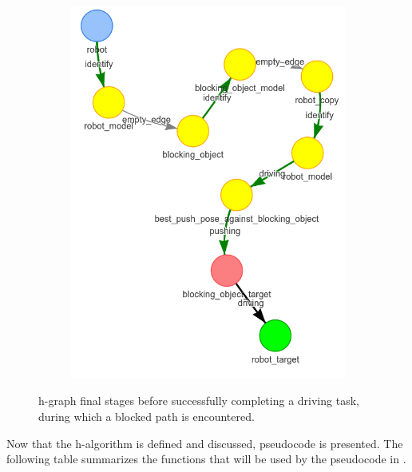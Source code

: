 \begin{figure}[H]
\begin{subfigure}{.3\textwidth}
    \includegraphics[width=\textwidth]{figures/proposed_method/connecting_nodes/blocking_obj/blocking_obj_6}
    \caption{}\label{subfig:blocking_obj_6}
  \end{subfigure}
  \caption{\ac{h-graph} final stages before successfully completing a driving task, during which a blocked path is encountered.}%
  \label{fig:blocking_obj_h-graph_two}
\end{figure}

Now that the \ac{h-algorithm} is defined and discussed, pseudocode is presented. The following table summarizes the functions that will be used by the pseudocode in .\bs

